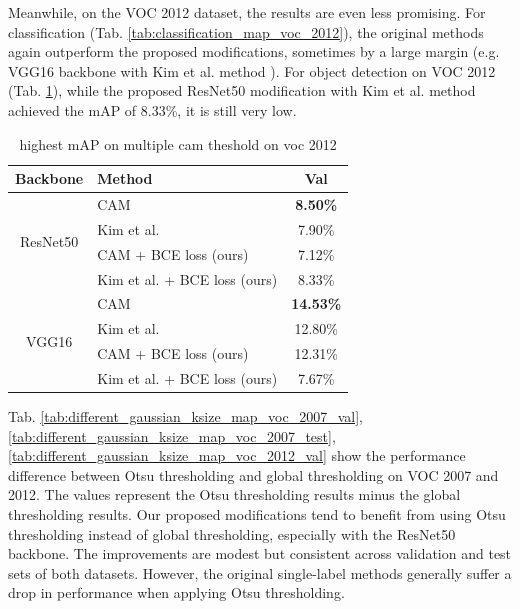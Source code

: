 \documentclass[conference]{IEEEtran}
\begin{document}
Meanwhile, on the VOC 2012 dataset, the results are even less promising. For classification (Tab. \ref{tab:classification_map_voc_2012}), the original methods again outperform the proposed modifications, sometimes by a large margin (e.g. VGG16 backbone with Kim et al. method \cite{kim2022bridging}). For object detection on VOC 2012 (Tab. \ref{tab:brute_force_cam_threshold_map_voc_2012}), while the proposed ResNet50 modification with Kim et al. method \cite{kim2022bridging} achieved the mAP of 8.33\%, it is still very low.


\begin{table}[t]
    \centering
    \caption{highest mAP on multiple cam theshold on voc 2012}
    \label{tab:brute_force_cam_threshold_map_voc_2012}
    \begin{tabular}{|c|l|c|}
        \hline
        Backbone                     & Method                                              & Val                             \\
        \hline
        \multirow[c]{4}{*}{ResNet50} & CAM\cite{zhou2015cnnlocalization}                   & \color{red} \bfseries{8.50\%}   \\
                                     & Kim et al. \cite{kim2022bridging}                   & 7.90\%                          \\
                                     & CAM\cite{zhou2015cnnlocalization} + BCE loss (ours) & 7.12\%                          \\
                                     & Kim et al. \cite{kim2022bridging} + BCE loss (ours) & 8.33\%                          \\
        \hline
        \multirow[c]{4}{*}{VGG16}    & CAM\cite{zhou2015cnnlocalization}                   & \color{blue} \bfseries{14.53\%} \\
                                     & Kim et al. \cite{kim2022bridging}                   & 12.80\%                         \\
                                     & CAM\cite{zhou2015cnnlocalization} + BCE loss (ours) & 12.31\%                         \\
                                     & Kim et al. \cite{kim2022bridging} + BCE loss (ours) & 7.67\%                          \\
        \hline
    \end{tabular}
\end{table}

Tab. \ref{tab:different_gaussian_ksize_map_voc_2007_val}, \ref{tab:different_gaussian_ksize_map_voc_2007_test}, \ref{tab:different_gaussian_ksize_map_voc_2012_val} show the performance difference between Otsu thresholding and global thresholding on VOC 2007 and 2012. The values represent the Otsu thresholding results minus the global thresholding results. Our proposed modifications tend to benefit from using Otsu thresholding instead of global thresholding, especially with the ResNet50 backbone. The improvements are modest but consistent across validation and test sets of both datasets. However, the original single-label methods generally suffer a drop in performance when applying Otsu thresholding.
\end{document}
